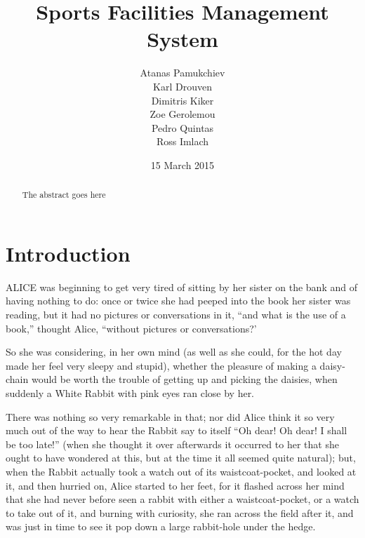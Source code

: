 \documentclass{l3proj}
\begin{document}
\title{Sports Facilities Management System}
\author{Atanas Pamukchiev \\
        Karl Drouven \\
      Dimitris Kiker \\
       Zoe Gerolemou \\
        Pedro Quintas\\
        Ross Imlach}
\date{15 March 2015}
\maketitle
\begin{abstract}

The abstract goes here

\end{abstract}
\educationalconsent
\tableofcontents
\chapter{Introduction}
\label{intro}

ALICE \cite{alice} was beginning to get very tired of sitting by her sister
on the bank and of having nothing to do: once or twice she had peeped into
the book her sister was reading, but it had no pictures or conversations in
it, ``and what is the use of a book,'' thought Alice, ``without pictures or
conversations?'

So she was considering, in her own mind (as well as she could, for the hot
day made her feel very sleepy and stupid), whether the pleasure of making a
daisy-chain would be worth the trouble of getting up and picking the
daisies, when suddenly a White Rabbit with pink eyes ran close by her.

There was nothing so very remarkable in that; nor did Alice think it so
very much out of the way to hear the Rabbit say to itself ``Oh dear! Oh
dear! I shall be too late!'' (when she thought it over afterwards it
occurred to her that she ought to have wondered at this, but at the time it
all seemed quite natural); but, when the Rabbit actually took a watch out
of its waistcoat-pocket, and looked at it, and then hurried on, Alice
started to her feet, for it flashed across her mind that she had never
before seen a rabbit with either a waistcoat-pocket, or a watch to take out
of it, and burning with curiosity, she ran across the field after it, and
was just in time to see it pop down a large rabbit-hole under the hedge.
\end{document}
